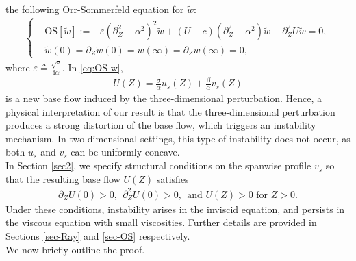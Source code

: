 \documentclass[reqno,11pt]{amsart}
\numberwithin{equation}{section}
\numberwithin{equation}{section}
\theoremstyle{plain}
\begin{document}
the following Orr-Sommerfeld equation for $\tilde{w}$:
\begin{align}\label{eq:OS-w}
    \left\{
    \begin{aligned}
		&\mathrm{OS}[\tilde{w}]:=-\varepsilon(\partial_Z^2-\alpha^2)^2\tilde{w}+(U-c)(\partial_Z^2-\alpha^2)\tilde{w}-\partial_Z^2U\tilde{w}=0,\\
		&\tilde{w}(0)=\partial_Z\tilde{w}(0)=\tilde{w}(\infty)=\partial_Z\tilde{w}(\infty)=0,
    \end{aligned}
    \right.
\end{align}
where $\varepsilon\triangleq\frac{\sqrt{\nu}}{\mathrm{ i}\alpha}$. In \eqref{eq:OS-w}, 
\begin{align}	U(Z)=\frac{\sigma}{\alpha}u_s(Z)+\frac{\beta}{\alpha}v_s(Z)\label{U}
\end{align}
is a new base flow induced by the three-dimensional perturbation. Hence, a physical interpretation of our result is that the three-dimensional perturbation produces a strong distortion of the base flow, which triggers an instability mechanism. In two-dimensional settings,  this type of instability does not occur, as both $u_s$ and $v_s$ can be uniformly concave.\\



In Section \ref{sec2}, we specify structural conditions on the spanwise profile $v_s$ so that the resulting base flow $U(Z)$ satisfies 
\begin{align}\label{SC}
	\partial_ZU(0)>0,~~\partial_Z^2U(0)>0,~~\text{and }U(Z)>0 \text{ for }Z>0.
\end{align}
Under these conditions, instability arises in the inviscid equation, and persists in the viscous equation with small viscosities. Further details are provided in Sections \ref{sec-Ray} and \ref{sec-OS} respectively.\\


We now briefly outline the proof.
\end{document}
